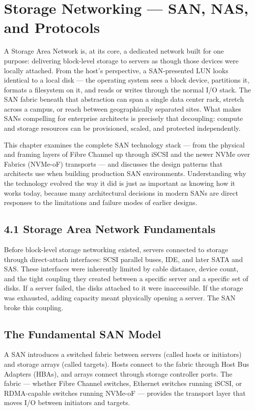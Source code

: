 \chapter{Storage Networking --- SAN, NAS, and Protocols}
\label{ch:6}

A Storage Area Network is, at its core, a dedicated network built for one purpose: delivering block-level storage to servers as though those devices were locally attached. From the host's perspective, a SAN-presented LUN looks identical to a local disk --- the operating system sees a block device, partitions it, formats a filesystem on it, and reads or writes through the normal I/O stack. The SAN fabric beneath that abstraction can span a single data center rack, stretch across a campus, or reach between geographically separated sites. What makes SANs compelling for enterprise architects is precisely that decoupling: compute and storage resources can be provisioned, scaled, and protected independently.

This chapter examines the complete SAN technology stack --- from the physical and framing layers of Fibre Channel up through iSCSI and the newer NVMe over Fabrics (NVMe-oF) transports --- and discusses the design patterns that architects use when building production SAN environments. Understanding why the technology evolved the way it did is just as important as knowing how it works today, because many architectural decisions in modern SANs are direct responses to the limitations and failure modes of earlier designs.

\section{4.1 Storage Area Network Fundamentals}
Before block-level storage networking existed, servers connected to storage through direct-attach interfaces: SCSI parallel buses, IDE, and later SATA and SAS. These interfaces were inherently limited by cable distance, device count, and the tight coupling they created between a specific server and a specific set of disks. If a server failed, the disks attached to it were inaccessible. If the storage was exhausted, adding capacity meant physically opening a server. The SAN broke this coupling.

\section{The Fundamental SAN Model}
A SAN introduces a switched fabric between servers (called hosts or initiators) and storage arrays (called targets). Hosts connect to the fabric through Host Bus Adapters (HBAs), and arrays connect through storage controller ports. The fabric --- whether Fibre Channel switches, Ethernet switches running iSCSI, or RDMA-capable switches running NVMe-oF --- provides the transport layer that moves I/O between initiators and targets.

